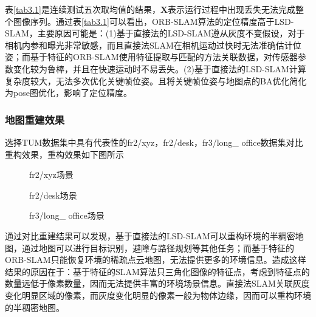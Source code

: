 表\ref{tab3.1}是连续测试五次取均值的结果，$\boldsymbol{X}$表示运行过程中出现丢失无法完成整个图像序列。通过表\ref{tab3.1}可以看出，ORB-SLAM算法的定位精度高于LSD-SLAM，主要原因可能是：(1)基于直接法的LSD-SLAM遵从灰度不变假设，对于相机内参和曝光非常敏感，而且直接法SLAM在相机运动过快时无法准确估计位姿；而基于特征的ORB-SLAM使用特征提取与匹配的方法关联数据，对传感器参数变化较为鲁棒，并且在快速运动时不易丢失。(2)基于直接法的LSD-SLAM计算复杂度较大，无法多次优化关键帧位姿。且将关键帧位姿与地图点的BA优化简化为pose图优化，影响了定位精度。

\subsubsection{地图重建效果}
选择TUM数据集中具有代表性的fr2/xyz，fr2/desk，fr3/long\_ office数据集对比重构效果，重构效果如下图所示
\begin{figure}[h]
\centering
\caption{fr2/xyz场景}
\label{fig3.8}
\end{figure}

\begin{figure}[h]
\centering
\caption{fr2/desk场景}
\label{fig3.9}
\end{figure}

\begin{figure}[h]
\centering
\caption{fr3/long\_ office场景}
\label{fig3.10}
\end{figure}

通过对比重建结果可以发现，基于直接法的LSD-SLAM可以重构环境的半稠密地图，通过地图可以进行目标识别，避障与路径规划等其他任务；而基于特征的ORB-SLAM只能恢复环境的稀疏点云地图，无法提供更多的环境信息。造成这样结果的原因在于：基于特征的SLAM算法只三角化图像的特征点，考虑到特征点的数量远低于像素数量，因而无法提供丰富的环境场景信息。直接法SLAM关联灰度变化明显区域的像素，而灰度变化明显的像素一般为物体边缘，因而可以重构环境的半稠密地图。

